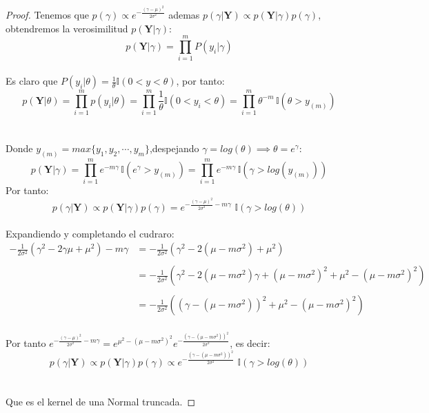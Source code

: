 \documentclass[11pt,letterpaper]{article}
\begin{document}
\begin{proof}
    Tenemos que $p(\gamma)\propto e^{-\frac{(\gamma-\mu)^2}{2\sigma^2}}$
    ademas $p(\gamma|\textbf{Y})\propto p(\textbf{Y}|\gamma)p(\gamma)$, obtendremos la verosimilitud $p(\textbf{Y}|\gamma)$:\,\\
    \begin{equation*}
        p(\textbf{Y}|\gamma)=\prod_{i=1}^{m}P(y_i|\gamma)
    \end{equation*}\,\\
    Es claro que $P(y_i|\theta)=\frac{1}{\theta}\mathbb{I}(0<y<\theta)$, por tanto:\,\\
    \begin{equation*}
        p(\textbf{Y}|\theta)=\prod_{i=1}^m p(y_i|\theta)=\prod_{i=1}^m \frac{1}{\theta}\mathbb{I}(0<y_i<\theta)=\prod_{i=1}^m\theta^{-m}\,\mathbb{I}(\theta>y_{(m)})
    \end{equation*}\,\\
    \,\\
    Donde $y_{(m)}=max\{y_1,y_2,\cdots,y_m\}$,despejando $\gamma=log(\theta)\implies \theta=e^{\gamma}$:\,\\
    \begin{equation*}
        p(\textbf{Y}|\gamma)=\prod_{i=1}^m e^{-m\gamma}\,\mathbb{I}(e^{\gamma}>y_{(m)})=\prod_{i=1}^m e^{-m\gamma}\,\mathbb{I}(\gamma>log(y_{(m)}))
    \end{equation*}
    Por tanto:\,\\
    \begin{equation*}
        p(\gamma|\textbf{Y})\propto p(\textbf{Y}|\gamma)p(\gamma)=e^{-\frac{(\gamma-\mu)^2}{2\sigma^2}-m\gamma}\,\,\mathbb{I}(\gamma>log(\theta))
    \end{equation*}\,\\
    Expandiendo  y completando el cudraro:\,\\
    \begin{align*}
        -\frac{1}{2\sigma^2}(\gamma^2-2\gamma\mu+\mu^2)-m\gamma&=-\frac{1}{2\sigma^2}(\gamma^2-2(\mu-m\sigma^2)+\mu^2)\,\\
        \,\\
        &=-\frac{1}{2\sigma^2}(\gamma^2-2(\mu-m\sigma^2)\gamma+(\mu-m\sigma^2)^2+\mu^2-(\mu-m\sigma^2)^2)
        \,\\
        \,\\
        &=-\frac{1}{2\sigma^2}((\gamma-(\mu-m\sigma^2))^2+\mu^2-(\mu-m\sigma^2)^2)
    \end{align*}\,\\
    Por tanto $e^{-\frac{(\gamma-\mu)^2}{2\sigma^2}-m\gamma}=e^{\mu^2-(\mu-m\sigma^2)^2}e^{-\frac{(\gamma-(\mu-m\sigma^2))^2}{2\sigma^2}}$, es decir:\,\\
    \begin{equation*}
         p(\gamma|\textbf{Y})\propto p(\textbf{Y}|\gamma)p(\gamma)\propto e^{-\frac{(\gamma-(\mu-m\sigma^2))^2}{2\sigma^2}}\,\,\mathbb{I}(\gamma>log(\theta))
    \end{equation*}\,\\
    \,\\
    Que es el kernel de una Normal truncada.
\end{proof}\,\\
\end{document}
